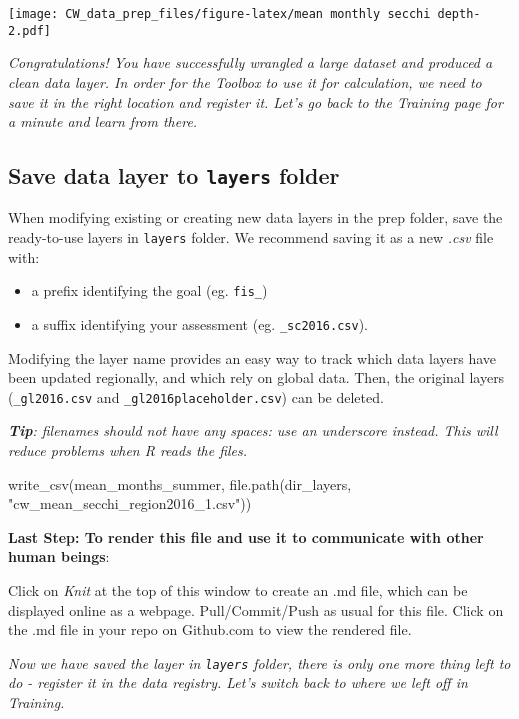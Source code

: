 \documentclass[
]{article}
\newenvironment{Shaded}{\begin{snugshade}}{\end{snugshade}}
\newcommand{\FunctionTok}[1]{\textcolor[rgb]{0.00,0.00,0.00}{#1}}
\newcommand{\NormalTok}[1]{#1}
\newcommand{\StringTok}[1]{\textcolor[rgb]{0.31,0.60,0.02}{#1}}
\providecommand{\tightlist}{%
  \setlength{\itemsep}{0pt}\setlength{\parskip}{0pt}}
\begin{document}
\texttt{[image: CW\_data\_prep\_files/figure-latex/mean monthly secchi depth-2.pdf]}

\emph{Congratulations! You have successfully wrangled a large dataset
and produced a clean data layer. In order for the Toolbox to use it for
calculation, we need to save it in the right location and register it.
Let's go back to the Training page for a minute and learn from there.}

\hypertarget{save-data-layer-to-layers-folder}{%
\subsection{\texorpdfstring{Save data layer to \texttt{layers}
folder}{Save data layer to layers folder}}\label{save-data-layer-to-layers-folder}}

When modifying existing or creating new data layers in the prep folder,
save the ready-to-use layers in \texttt{layers} folder. We recommend
saving it as a new \emph{.csv} file with:

\begin{itemize}
\tightlist
\item
  a prefix identifying the goal (eg. \texttt{fis\_})
\item
  a suffix identifying your assessment (eg. \texttt{\_sc2016.csv}).
\end{itemize}

Modifying the layer name provides an easy way to track which data layers
have been updated regionally, and which rely on global data. Then, the
original layers (\texttt{\_gl2016.csv} and
\texttt{\_gl2016placeholder.csv}) can be deleted.

\emph{\textbf{Tip}: filenames should not have any spaces: use an
underscore instead. This will reduce problems when R reads the files.}

\begin{Shaded}
\begin{Highlighting}[]
\FunctionTok{write\_csv}\NormalTok{(mean\_months\_summer, }\FunctionTok{file.path}\NormalTok{(dir\_layers, }\StringTok{"cw\_mean\_secchi\_region2016\_1.csv"}\NormalTok{))}
\end{Highlighting}
\end{Shaded}

\textbf{Last Step: To render this file and use it to communicate with
other human beings}:

Click on \emph{Knit} at the top of this window to create an .md file,
which can be displayed online as a webpage. Pull/Commit/Push as usual
for this file. Click on the .md file in your repo on Github.com to view
the rendered file.

\emph{Now we have saved the layer in \texttt{layers} folder, there is
only one more thing left to do - register it in the data registry. Let's
switch back to where we left off in Training.}
\end{document}
